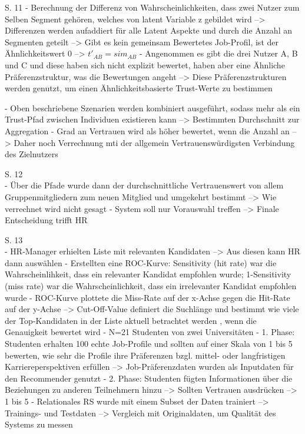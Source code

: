S. 11
- Berechnung der Differenz von Wahrscheinlichkeiten, dass zwei Nutzer zum Selben Segment gehören, welches von latent Variable z gebildet wird --> Differenzen werden aufaddiert für alle Latent Aspekte und durch die Anzahl an Segmenten geteilt --> Gibt es kein gemeinsam Bewertetes Job-Profil, ist der Ähnlichkeitswert 0 --> $t'_{AB}=sim_{AB}$
- Angenommen es gibt die drei Nutzer A, B und C und diese haben sich nicht explizit bewertet, haben aber eine Ähnliche Präferenzstruktur, was die Bewertungen angeht --> Diese Präferenzstrukturen werden genutzt, um einen Ähnlichkeitsbasierte Trust-Werte zu bestimmen

- Oben beschriebene Szenarien werden kombiniert ausgeführt, sodass mehr als ein Trust-Pfad zwischen Individuen existieren kann --> Bestimmten Durchschnitt zur Aggregation
- Grad an Vertrauen wird als höher bewertet, wenn die Anzahl an --> Daher noch Verrechnung mti der allgemein Vertrauenswürdigsten Verbindung des Zielnutzers

S. 12\\
- Über die Pfade wurde dann der durchschnittliche Vertrauenswert von allem Gruppenmitgliedern zum neuen Mitglied und umgekehrt bestimmt --> Wie verrechnet wird nicht gesagt
- System soll nur Vorauswahl treffen --> Finale Entscheidung trifft HR

S. 13\\
- HR-Manager erhielten Liste mit relevanten Kandidaten --> Aus diesen kann HR dann auswählen
- Erstellten eine ROC-Kurve: Sensitivity (hit rate) war die Wahrscheinlihkeit, dass ein relevanter Kandidat empfohlen wurde; 1-Sensitivity (miss rate) war die Wahrscheinlichkeit, dass ein irrelevanter Kandidat empfohlen wurde
- ROC-Kurve plottete die Miss-Rate auf der x-Achse gegen die Hit-Rate auf der y-Achse --> Cut-Off-Value definiert die Suchlänge und bestimmt wie viele der Top-Kandidaten in der Liste aktuell betrachtet werden , wenn die Genauigkeit bewertet wird
- N=21 Studenten von zwei Universitäten
- 1. Phase: Studenten erhalten 100 echte Job-Profile und sollten auf einer Skala von 1 bis 5 bewerten, wie sehr die Profile ihre Präferenzen bzgl. mittel- oder langfristigen Karriereperspektiven erfüllen --> Job-Präferenzdaten wurden als Inputdaten für den Recommender genutzt
- 2. Phase: Studenten fügten Informationen über die Beziehungen zu anderen Teilnehmern hinzu --> Sollten Vertrauen ausdrücken --> 1 bis 5
- Relationales RS wurde mit einem Subset der Daten trainiert --> Trainings- und Testdaten --> Vergleich mit Originaldaten, um Qualität des Systems zu messen

